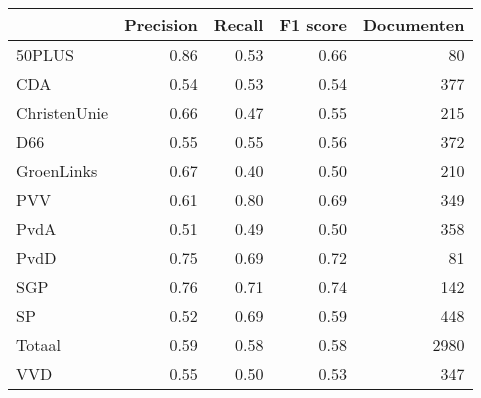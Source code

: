 \begin{tabular}{lrrrr}
\toprule
{} &  Precision &  Recall &  F1 score &  Documenten \\
\midrule
50PLUS       &       0.86 &    0.53 &      0.66 &          80 \\
CDA          &       0.54 &    0.53 &      0.54 &         377 \\
ChristenUnie &       0.66 &    0.47 &      0.55 &         215 \\
D66          &       0.55 &    0.55 &      0.56 &         372 \\
GroenLinks   &       0.67 &    0.40 &      0.50 &         210 \\
PVV          &       0.61 &    0.80 &      0.69 &         349 \\
PvdA         &       0.51 &    0.49 &      0.50 &         358 \\
PvdD         &       0.75 &    0.69 &      0.72 &          81 \\
SGP          &       0.76 &    0.71 &      0.74 &         142 \\
SP           &       0.52 &    0.69 &      0.59 &         448 \\
Totaal       &       0.59 &    0.58 &      0.58 &        2980 \\
VVD          &       0.55 &    0.50 &      0.53 &         347 \\
\bottomrule
\end{tabular}
